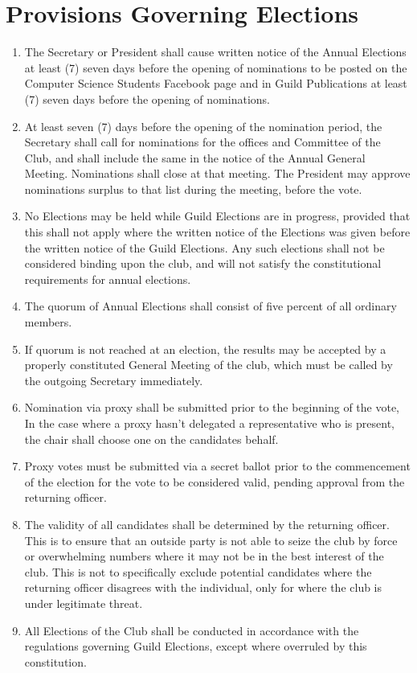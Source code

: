 \documentclass[10pt,a4paper]{report}
\begin{document}
	\section{Provisions Governing Elections}
		\begin{enumerate}[label=\alph*]
			\item The Secretary or President shall cause written notice of the Annual Elections at least (7) seven days before the opening of nominations to be posted on the Computer Science Students Facebook page and in Guild Publications at least (7) seven days before the opening of nominations.
			\item At least seven (7) days before the opening of the nomination period, the Secretary shall call for nominations for the offices and Committee of the Club, and shall include the same in the notice of the Annual General Meeting. Nominations shall close at that meeting. The President may approve nominations surplus to that list during the meeting, before the vote.
			\item No Elections may be held while Guild Elections are in progress, provided that this shall not apply where the written notice of the Elections was given before the written notice of the Guild Elections. Any such elections shall not be considered binding upon the club, and will not satisfy the constitutional requirements for annual elections.
			\item The quorum of Annual Elections shall consist of five percent of all ordinary members.
			\item If quorum is not reached at an election, the results may be accepted by a properly constituted General Meeting of the club, which must be called by the outgoing Secretary immediately.
			\item Nomination via proxy shall be submitted prior to the beginning of the vote, In the case where a proxy hasn't delegated a representative who is present, the chair shall choose one on the candidates behalf.
			\item Proxy votes must be submitted via a secret ballot prior to the commencement of the election for the vote to be considered valid, pending approval from the returning officer.
			\item The validity of all candidates shall be determined by the returning officer. This is to ensure that an outside party is not able to seize the club by force or overwhelming numbers where it may not be in the best interest of the club. This is not to specifically exclude potential candidates where the returning officer disagrees with the individual, only for where the club is under legitimate threat.
			\item All Elections of the Club shall be conducted in accordance with the regulations governing Guild Elections, except where overruled by this constitution.
		\end{enumerate}
\end{document}
